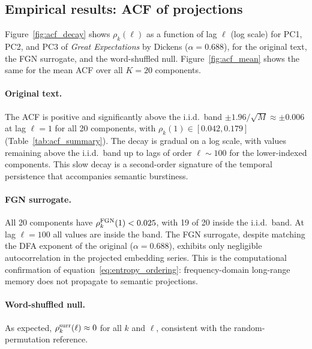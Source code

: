 \documentclass[12pt,a4paper]{article}
\begin{document}
\subsection{Empirical results: ACF of projections}
\label{sec:acf_results}

Figure~\ref{fig:acf_decay} shows $\rho_k(\ell)$ as a function of lag
$\ell$ (log scale) for PC1, PC2, and PC3 of
\emph{Great Expectations} by Dickens ($\alpha = 0.688$), for the original text, the FGN surrogate, and
the word-shuffled null.
Figure~\ref{fig:acf_mean} shows the same for the mean ACF over all
$K = 20$ components.

\paragraph{Original text.}
The ACF is positive and significantly above the i.i.d.\ band
$\pm 1.96/\sqrt{M} \approx \pm 0.006$ at lag $\ell = 1$ for all 20
components, with $\rho_k(1) \in [0.042, 0.179]$
(Table~\ref{tab:acf_summary}).
The decay is gradual on a log scale, with values remaining above the
i.i.d.\ band up to lags of order $\ell \sim 100$ for the
lower-indexed components.
This slow decay is a second-order signature of the temporal
persistence that accompanies semantic burstiness.

\paragraph{FGN surrogate.}
All 20 components have $\rho_k^{\rm FGN}(1) < 0.025$, with 19 of 20
inside the i.i.d.\ band.
At lag $\ell = 100$ all values are inside the band.
The FGN surrogate, despite matching the DFA exponent of the original
($\alpha = 0.688$), exhibits only negligible autocorrelation in the projected
embedding series.
This is the computational confirmation of
equation~\eqref{eq:entropy_ordering}: frequency-domain long-range
memory does not propagate to semantic projections.

\paragraph{Word-shuffled null.}
As expected, $\rho_k^{\rm surr}(\ell) \approx 0$ for all $k$ and
$\ell$, consistent with the random-permutation reference.
\end{document}
